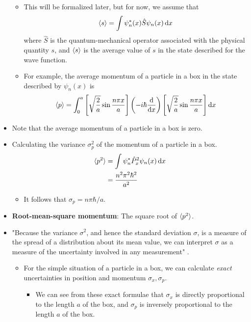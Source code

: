 \documentclass[../notes.tex]{subfiles}
\begin{document}
\begin{itemize}
\begin{itemize}
        \item This will be formalized later, but for now, we assume that
        \begin{equation*}
            \langle{s}\rangle = \int\psi_n^*(x)\hat{S}\psi_n(x)\dd{x}
        \end{equation*}
        where $\hat{S}$ is the quantum-mechanical operator associated with the physical quantity $s$, and $\langle{s}\rangle$ is the average value of $s$ in the state described for the wave function.
        \item For example, the average momentum of a particle in a box in the state described by $\psi_n(x)$ is
        \begin{equation*}
            \langle{p}\rangle = \int_0^a\left[ \sqrt{\frac{2}{a}}\sin\frac{n\pi x}{a} \right]\left( -i\hbar\dv{x} \right)\left[ \sqrt{\frac{2}{a}}\sin\frac{n\pi x}{a} \right]\dd{x}
        \end{equation*}
    \end{itemize}
    \item Note that the average momentum of a particle in a box is zero.
    \item {}Calculating the variance $\sigma_p^2$ of the momentum of a particle in a box.
    \begin{align*}
        \langle{p^2}\rangle &= \int\psi_n^*\hat{P}_x^2\psi_n(x)\dd{x}\\
        &= \frac{n^2\pi^2\hbar^2}{a^2}
    \end{align*}
    \begin{itemize}
        \item It follows that $\sigma_p=n\pi\hbar/a$.
    \end{itemize}
    \item \textbf{Root-mean-square momentum}: The square root of $\langle{p^2}\rangle$.
    \item "Because the variance $\sigma^2$, and hence the standard deviation $\sigma$, is a measure of the spread of a distribution about its mean value, we can interpret $\sigma$ as a measure of the uncertainty involved in any measurement" \parencite[89]{bib:McQuarrieSimon}.
    \begin{itemize}
        \item For the simple situation of a particle in a box, we can calculate \emph{exact} uncertainties in position and momentum $\sigma_x,\sigma_p$.
        \begin{itemize}
            \item We can see from these exact formulae that $\sigma_x$ is directly proportional to the length $a$ of the box, and $\sigma_p$ is inversely proportional to the length $a$ of the box.

\end{itemize}
\end{itemize}
\end{itemize}
\end{document}
